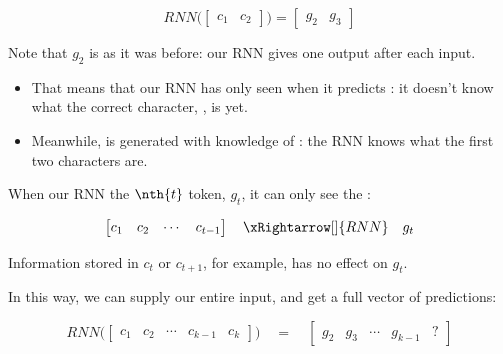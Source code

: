         \begin{equation}
            RNN\Bigg(\begin{bmatrix}
                c_1 & c_2
            \end{bmatrix}\Bigg)
            =
            \begin{bmatrix}
                g_2 & g_3
            \end{bmatrix}
        \end{equation}

        Note that $g_2$ is  as it was before: our RNN gives one output after each input.

        \begin{itemize}
            \item That means that our RNN has only seen  when it predicts : it doesn't know what the correct character, , is yet.

            \item Meanwhile,  is generated with knowledge of : the RNN knows what the first two characters are.\\
        \end{itemize}

        

        \begin{concept}
            When our RNN  the $\nth{t}$ token, $g_t$, it can only see the :

            \begin{equation*}
                \begin{bmatrix}
                    c_1 & c_2 & \cdots & c_{t-1}
                \end{bmatrix}
                \quad \xRightarrow[]{RNN} \quad
                g_{t}
            \end{equation*}

            Information stored in $c_t$ or $c_{t+1}$, for example, has no effect on $g_t$.
        \end{concept}

        In this way, we can supply our entire input, and get a full vector of predictions:

        \begin{equation}
            RNN 
            \Bigg(
            \begin{bmatrix}
                c_1 & c_2 & \cdots & c_{k-1} & c_{k}
            \end{bmatrix}
            \Bigg)
            \quad=\quad 
            \begin{bmatrix}
                g_2 & g_3 & \cdots & g_{k-1} & ?
            \end{bmatrix}
        \end{equation}


